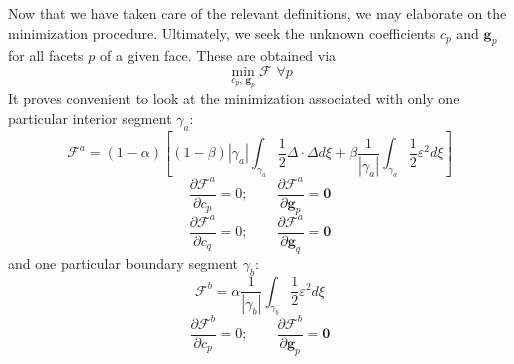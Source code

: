 \documentclass[11pt]{article} %
\begin{document}
Now that we have taken care of the relevant definitions, we may elaborate on the minimization procedure. Ultimately, we seek the unknown coefficients $c_p$ and $\mathbf{g}_p$ for all facets $p$ of a given face. These are obtained via
\begin{equation}
	\min_{c_p, \, \mathbf{g}_p} \mathcal{F} \, \, \forall p
\end{equation}
It proves convenient to look at the minimization associated with only one particular interior segment $\gamma_a$:
\begin{equation}
	\mathcal{F}^a = (1-\alpha) \left[ (1-\beta) | \gamma_a | \int_{\gamma_a} \frac{1}{2} \Delta \cdot \Delta d \xi + \beta \frac{1}{| \gamma_a |} \int_{\gamma_a} \frac{1}{2} \varepsilon^2 d \xi \right]
\end{equation}
\begin{equation}
	\frac{\partial \mathcal{F}^a}{\partial c_p} = 0; \qquad \frac{\partial \mathcal{F}^a}{\partial \mathbf{g}_p} = \mathbf{0}
\end{equation}
\begin{equation}
	\frac{\partial \mathcal{F}^a}{\partial c_q} = 0; \qquad \frac{\partial \mathcal{F}^a}{\partial \mathbf{g}_q} = \mathbf{0}
\end{equation}
and one particular boundary segment $\gamma_b$:
\begin{equation}
	\mathcal{F}^b = \alpha \frac{1}{| \gamma_b |} \int_{\gamma_b} \frac{1}{2} \varepsilon^2 d \xi
\end{equation}
\begin{equation}
	\frac{\partial \mathcal{F}^b}{\partial c_p} = 0; \qquad \frac{\partial \mathcal{F}^b}{\partial \mathbf{g}_p} = \mathbf{0}
\end{equation}
\end{document}
